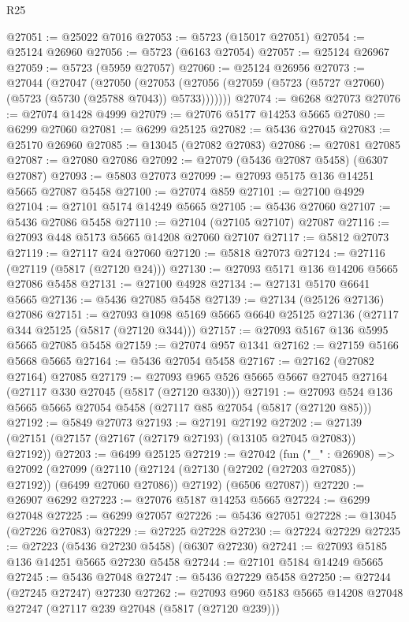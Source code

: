 \begin{lexlean}{R25}
\begin{coremodule}
@27051 := @25022 @7016
@27053 := @5723 (@15017 @27051)
@27054 := @25124 @26960
@27056 := @5723 (@6163 @27054)
@27057 := @25124 @26967
@27059 := @5723 (@5959 @27057)
@27060 := @25124 @26956
@27073 := @27044
    (@27047
      (@27050
        (@27053 (@27056 (@27059 (@5723 (@5727 @27060) (@5723 (@5730 (@25788 @7043)) @5733)))))))
@27074 := @6268 @27073
@27076 := @27074 @1428 @4999
@27079 := @27076 @5177 @14253 @5665
@27080 := @6299 @27060
@27081 := @6299 @25125
@27082 := @5436 @27045
@27083 := @25170 @26960
@27085 := @13045 (@27082 @27083)
@27086 := @27081 @27085
@27087 := @27080 @27086
@27092 := @27079 (@5436 @27087 @5458) (@6307 @27087)
@27093 := @5803 @27073
@27099 := @27093 @5175 @136 @14251 @5665 @27087 @5458
@27100 := @27074 @859
@27101 := @27100 @4929
@27104 := @27101 @5174 @14249 @5665
@27105 := @5436 @27060
@27107 := @5436 @27086 @5458
@27110 := @27104 (@27105 @27107) @27087
@27116 := @27093 @448 @5173 @5665 @14208 @27060 @27107
@27117 := @5812 @27073
@27119 := @27117 @24 @27060
@27120 := @5818 @27073
@27124 := @27116 (@27119 (@5817 (@27120 @24)))
@27130 := @27093 @5171 @136 @14206 @5665 @27086 @5458
@27131 := @27100 @4928
@27134 := @27131 @5170 @6641 @5665
@27136 := @5436 @27085 @5458
@27139 := @27134 (@25126 @27136) @27086
@27151 := @27093 @1098 @5169 @5665 @6640 @25125 @27136 (@27117 @344 @25125 (@5817 (@27120 @344)))
@27157 := @27093 @5167 @136 @5995 @5665 @27085 @5458
@27159 := @27074 @957 @1341
@27162 := @27159 @5166 @5668 @5665
@27164 := @5436 @27054 @5458
@27167 := @27162 (@27082 @27164) @27085
@27179 := @27093 @965 @526 @5665 @5667 @27045 @27164 (@27117 @330 @27045 (@5817 (@27120 @330)))
@27191 := @27093 @524 @136 @5665 @5665 @27054 @5458 (@27117 @85 @27054 (@5817 (@27120 @85)))
@27192 := @5849 @27073
@27193 := @27191 @27192
@27202 := @27139 (@27151 (@27157 (@27167 (@27179 @27193) (@13105 @27045 @27083)) @27192))
@27203 := @6499 @25125
@27219 := @27042
    (fun ("_" : @26908) =>
    @27092
      (@27099
        (@27110 (@27124 (@27130 (@27202 (@27203 @27085)) @27192)) (@6499 @27060 @27086))
        @27192)
      (@6506 @27087))
@27220 := @26907 @6292
@27223 := @27076 @5187 @14253 @5665
@27224 := @6299 @27048
@27225 := @6299 @27057
@27226 := @5436 @27051
@27228 := @13045 (@27226 @27083)
@27229 := @27225 @27228
@27230 := @27224 @27229
@27235 := @27223 (@5436 @27230 @5458) (@6307 @27230)
@27241 := @27093 @5185 @136 @14251 @5665 @27230 @5458
@27244 := @27101 @5184 @14249 @5665
@27245 := @5436 @27048
@27247 := @5436 @27229 @5458
@27250 := @27244 (@27245 @27247) @27230
@27262 := @27093 @960 @5183 @5665 @14208 @27048 @27247 (@27117 @239 @27048 (@5817 (@27120 @239)))

\end{coremodule}
\end{lexlean}

